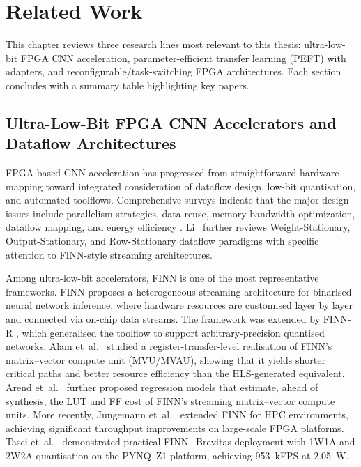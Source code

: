 \documentclass[12pt, a4paper]{report}
\numberwithin{equation}{chapter}
\numberwithin{figure}{chapter}
\numberwithin{table}{chapter}
\numberwithin{algorithm}{chapter}
\begin{document}
\chapter{Related Work}
\label{ch:related_work}

This chapter reviews three research lines most relevant to this thesis: ultra-low-bit FPGA CNN acceleration, parameter-efficient transfer learning (PEFT) with adapters, and reconfigurable/task-switching FPGA architectures. Each section concludes with a summary table highlighting key papers.

\section{Ultra-Low-Bit FPGA CNN Accelerators and Dataflow Architectures}
\label{sec:related_finn}

FPGA-based CNN acceleration has progressed from straightforward hardware mapping toward integrated consideration of dataflow design, low-bit quantisation, and automated toolflows. Comprehensive surveys indicate that the major design issues include parallelism strategies, data reuse, memory bandwidth optimization, dataflow mapping, and energy efficiency \cite{Gao2025CNNFPGA, Jiang2025FPGACNNReview, Nechi2023FPGADLSurvey}. Li~\cite{Li2025DataflowTiling} further reviews Weight-Stationary, Output-Stationary, and Row-Stationary dataflow paradigms with specific attention to FINN-style streaming architectures.

Among ultra-low-bit accelerators, FINN \cite{Umuroglu2017FINN} is one of the most representative frameworks. FINN proposes a heterogeneous streaming architecture for binarised neural network inference, where hardware resources are customised layer by layer and connected via on-chip data streams. The framework was extended by FINN-R \cite{Blott2018FINNR}, which generalised the toolflow to support arbitrary-precision quantised networks. Alam et~al.~\cite{Alam2023RTLMVU} studied a register-transfer-level realisation of FINN's matrix--vector compute unit (MVU/MVAU), showing that it yields shorter critical paths and better resource efficiency than the HLS-generated equivalent. Arend et~al.~\cite{Arend2025MVAUPredict} further proposed regression models that estimate, ahead of synthesis, the LUT and FF cost of FINN's streaming matrix--vector compute units. More recently, Jungemann et~al.~\cite{Jungemann2025FINNHPC} extended FINN for HPC environments, achieving significant throughput improvements on large-scale FPGA platforms. Tasci et~al.~\cite{Tasci2025FPGAQNN} demonstrated practical FINN+Brevitas deployment with 1W1A and 2W2A quantisation on the PYNQ~Z1 platform, achieving 953~kFPS at 2.05~W.
\end{document}

